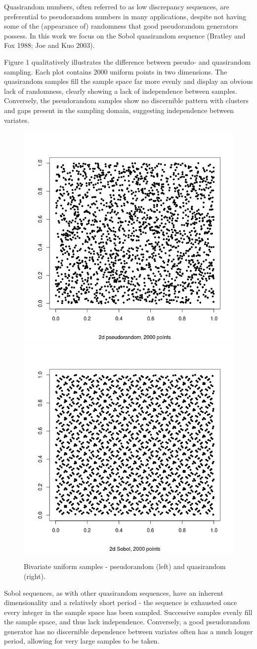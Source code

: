 \documentclass[]{article}
\begin{document}
Quasirandom numbers, often referred to as low discrepancy sequences, are
preferential to pseudorandom numbers in many applications, despite not
having some of the (appearance of) randomness that good pseudorandom
generators possess. In this work we focus on the Sobol quasirandom
sequence (Bratley and Fox 1988; Joe and Kuo 2003).

Figure 1 qualitatively illustrates the difference between pseudo- and
quasirandom sampling. Each plot contains 2000 uniform points in two
dimensions. The quasirandom samples fill the sample space far more
evenly and display an obvious lack of randomness, clearly showing a lack
of independence between samples. Conversely, the pseudorandom samples
show no discernible pattern with clusters and gaps present in the
sampling domain, suggesting independence between variates.

\begin{figure}[H]
\includegraphics[width=0.5\linewidth]{figures/pseudo2d} \includegraphics[width=0.5\linewidth]{figures/quasi2d} \caption{Bivariate uniform samples -  pseudorandom (left) and quasirandom (right).}\label{fig:unnamed-chunk-1}
\end{figure}

Sobol sequences, as with other quasirandom sequences, have an inherent
dimensionality and a relatively short period - the sequence is exhausted
once every integer in the sample space has been sampled. Successive
samples evenly fill the sample space, and thus lack independence.
Conversely, a good pseudorandom generator has no discernible dependence
between variates often has a much longer period, allowing for very large
samples to be taken.
\end{document}
